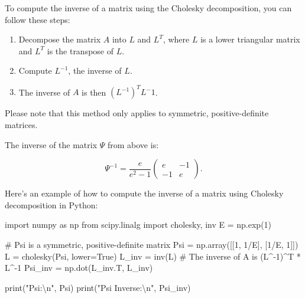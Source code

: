 \documentclass[
  letterpaper,
  DIV=11,
  numbers=noendperiod]{scrreprt}
\newenvironment{Shaded}{\begin{snugshade}}{\end{snugshade}}
\newcommand{\BuiltInTok}[1]{\textcolor[rgb]{0.00,0.23,0.31}{#1}}
\newcommand{\CharTok}[1]{\textcolor[rgb]{0.13,0.47,0.30}{#1}}
\newcommand{\CommentTok}[1]{\textcolor[rgb]{0.37,0.37,0.37}{#1}}
\newcommand{\DecValTok}[1]{\textcolor[rgb]{0.68,0.00,0.00}{#1}}
\newcommand{\ImportTok}[1]{\textcolor[rgb]{0.00,0.46,0.62}{#1}}
\newcommand{\NormalTok}[1]{\textcolor[rgb]{0.00,0.23,0.31}{#1}}
\newcommand{\OperatorTok}[1]{\textcolor[rgb]{0.37,0.37,0.37}{#1}}
\newcommand{\StringTok}[1]{\textcolor[rgb]{0.13,0.47,0.30}{#1}}
\newcommand{\VariableTok}[1]{\textcolor[rgb]{0.07,0.07,0.07}{#1}}
\providecommand{\tightlist}{%
  \setlength{\itemsep}{0pt}\setlength{\parskip}{0pt}}\usepackage{longtable,booktabs,array}
\begin{document}
To compute the inverse of a matrix using the Cholesky decomposition, you
can follow these steps:

\begin{enumerate}
\def\labelenumi{\arabic{enumi}.}
\tightlist
\item
  Decompose the matrix \(A\) into \(L\) and \(L^T\), where \(L\) is a
  lower triangular matrix and \(L^T\) is the transpose of \(L\).
\item
  Compute \(L^{-1}\), the inverse of \(L\).
\item
  The inverse of \(A\) is then \((L^{-1})^T  L^-1\).
\end{enumerate}

Please note that this method only applies to symmetric,
positive-definite matrices.

The inverse of the matrix \(\Psi\) from above is:

\[
\Psi^{-1} = \frac{e}{e^2 -1} \begin{pmatrix}
e & -1\\
-1 & e
\end{pmatrix}.
\]

Here's an example of how to compute the inverse of a matrix using
Cholesky decomposition in Python:

\begin{Shaded}
\begin{Highlighting}[]
\ImportTok{import}\NormalTok{ numpy }\ImportTok{as}\NormalTok{ np}
\ImportTok{from}\NormalTok{ scipy.linalg }\ImportTok{import}\NormalTok{ cholesky, inv}
\NormalTok{E }\OperatorTok{=}\NormalTok{ np.exp(}\DecValTok{1}\NormalTok{)}

\CommentTok{\# Psi is a symmetric, positive{-}definite matrix }
\NormalTok{Psi }\OperatorTok{=}\NormalTok{ np.array([[}\DecValTok{1}\NormalTok{, }\DecValTok{1}\OperatorTok{/}\NormalTok{E], [}\DecValTok{1}\OperatorTok{/}\NormalTok{E, }\DecValTok{1}\NormalTok{]])}
\NormalTok{L }\OperatorTok{=}\NormalTok{ cholesky(Psi, lower}\OperatorTok{=}\VariableTok{True}\NormalTok{)}
\NormalTok{L\_inv }\OperatorTok{=}\NormalTok{ inv(L)}
\CommentTok{\# The inverse of A is (L\^{}{-}1)\^{}T * L\^{}{-}1}
\NormalTok{Psi\_inv }\OperatorTok{=}\NormalTok{ np.dot(L\_inv.T, L\_inv)}

\BuiltInTok{print}\NormalTok{(}\StringTok{"Psi:}\CharTok{\textbackslash{}n}\StringTok{"}\NormalTok{, Psi)}
\BuiltInTok{print}\NormalTok{(}\StringTok{"Psi Inverse:}\CharTok{\textbackslash{}n}\StringTok{"}\NormalTok{, Psi\_inv)}
\end{Highlighting}
\end{Shaded}
\end{document}
